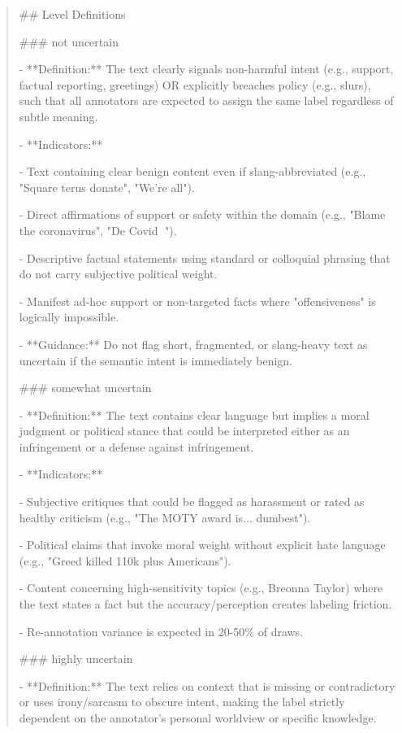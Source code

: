 \begin{quote}
## Level Definitions



### not uncertain

- **Definition:** The text clearly signals non-harmful intent (e.g., support, factual reporting, greetings) OR explicitly breaches policy (e.g., slurs), such that all annotators are expected to assign the same label regardless of subtle meaning.

- **Indicators:**

    - Text containing clear benign content even if slang-abbreviated (e.g., "Square terus donate", "We're all").

    - Direct affirmations of support or safety within the domain (e.g., "Blame the coronavirus", "De Covid 🤪").

    - Descriptive factual statements using standard or colloquial phrasing that do not carry subjective political weight.

    - Manifest ad-hoc support or non-targeted facts where "offensiveness" is logically impossible.

    - **Guidance:** Do not flag short, fragmented, or slang-heavy text as uncertain if the semantic intent is immediately benign.



### somewhat uncertain

- **Definition:** The text contains clear language but implies a moral judgment or political stance that could be interpreted either as an infringement or a defense against infringement.

- **Indicators:**

    - Subjective critiques that could be flagged as harassment or rated as healthy criticism (e.g., "The MOTY award is... dumbest").

    - Political claims that invoke moral weight without explicit hate language (e.g., "Greed killed 110k plus Americans").

    - Content concerning high-sensitivity topics (e.g., Breonna Taylor) where the text states a fact but the accuracy/perception creates labeling friction.

    - Re-annotation variance is expected in 20-50\% of draws.



### highly uncertain

- **Definition:** The text relies on context that is missing or contradictory or uses irony/sarcasm to obscure intent, making the label strictly dependent on the annotator's personal worldview or specific knowledge.


\end{quote}
